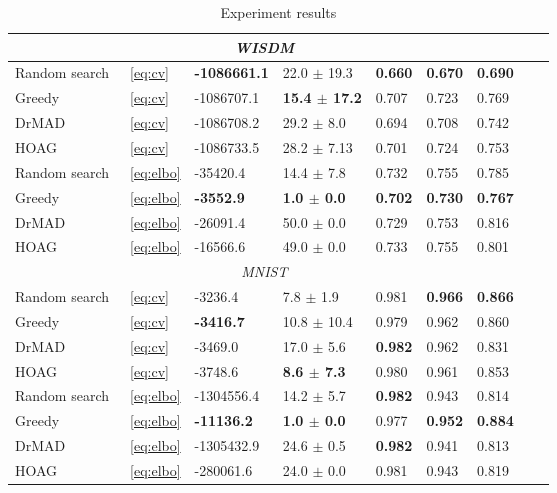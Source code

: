 \documentclass[smallextended]{svjour3}
\begin{document}
\begin{table}
\begin{tabularx}{\textwidth}{ |X|p{0.75cm}|X|X|p{1cm}|X|X|X|X|}
\multicolumn{7}{|c|}{\textit{WISDM}}  \\
\hline
Random search & ~\eqref{eq:cv} & \bf -1086661.1  & 22.0 $\pm$ 19.3  & \bf 0.660 & \bf 0.670 & \bf 0.690  \\
\hline
Greedy & ~\eqref{eq:cv} & -1086707.1 & \bf 15.4 $\pm$ 17.2 & 0.707 &  0.723  &  0.769\\
\hline
DrMAD & ~\eqref{eq:cv} & -1086708.2 & 29.2 $\pm$ 8.0 &  0.694 &  0.708 & 0.742 \\
\hline
HOAG & ~\eqref{eq:cv} & -1086733.5 & 28.2 $\pm$ 7.13&   0.701 & 0.724 & 0.753 \\
\hline
Random search & ~\eqref{eq:elbo} & -35420.4 &   14.4 $\pm$ 7.8  &   0.732 &   0.755 & 0.785 \\
\hline
Greedy & ~\eqref{eq:elbo} & \bf -3552.9 &\bf 1.0 $\pm$ 0.0  &   \bf 0.702 & \bf 0.730  &  \bf 0.767\\
\hline
DrMAD & ~\eqref{eq:elbo} & -26091.4 &   50.0 $\pm$ 0.0  & 0.729 &  0.753 & 0.816 \\
\hline
HOAG & ~\eqref{eq:elbo} &  -16566.6 & 49.0 $\pm$ 0.0  &  0.733 &  0.755 &  0.801 \\
\hline



\multicolumn{7}{|c|}{\textit{MNIST}}  \\
\hline
Random search & ~\eqref{eq:cv} & -3236.4  & 7.8 $\pm$ 1.9  &   0.981 & \bf 0.966 & \bf 0.866 \\
\hline
Greedy & ~\eqref{eq:cv} & \bf -3416.7 & 10.8 $\pm$ 10.4 & 0.979 & 0.962 & 0.860\\
\hline
DrMAD & ~\eqref{eq:cv} & -3469.0 & 17.0 $\pm$ 5.6 & \bf  0.982 & 0.962 & 0.831\\
\hline
HOAG & ~\eqref{eq:cv} & -3748.6 & \bf 8.6 $\pm$ 7.3&   0.980 &  0.961  & 0.853 \\
\hline
Random search & ~\eqref{eq:elbo} & -1304556.4 &  14.2 $\pm$ 5.7 &  \bf 0.982 & 0.943 & 0.814 \\
\hline
Greedy & ~\eqref{eq:elbo} & \bf -11136.2 & \bf 1.0 $\pm$ 0.0  &  0.977 & \bf 0.952 & \bf 0.884\\
\hline
DrMAD & ~\eqref{eq:elbo} & -1305432.9 & 24.6 $\pm$ 0.5  & \bf 0.982 & 0.941 & 0.813 \\
\hline
HOAG & ~\eqref{eq:elbo} &  -280061.6 & 24.0 $\pm$ 0.0  & 0.981 & 0.943 & 0.819\\
\hline


\hline
\end{tabularx}
\caption{Experiment results}
\label{table:table}
\end{table}
\end{document}
